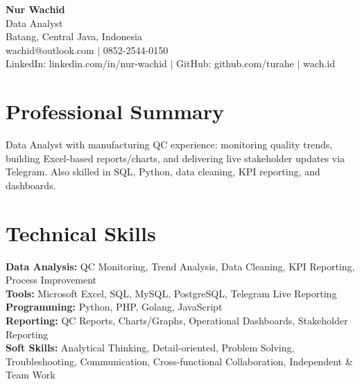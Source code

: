 \begin{center}
  {\LARGE\bfseries Nur Wachid}\\[3pt]
  Data Analyst\\[2pt]
  Batang, Central Java, Indonesia\\[2pt]
  wachid@outlook.com $|$ 0852-2544-0150\\[1pt]
  LinkedIn: linkedin.com/in/nur-wachid $|$ GitHub: github.com/turahe $|$ wach.id
\end{center}
\section*{Professional Summary}
Data Analyst with manufacturing QC experience: monitoring quality trends, building Excel-based reports/charts, and delivering live stakeholder updates via Telegram. Also skilled in SQL, Python, data cleaning, KPI reporting, and dashboards.
\section*{Technical Skills}
\textbf{Data Analysis:} QC Monitoring, Trend Analysis, Data Cleaning, KPI Reporting, Process Improvement\\[1pt]
\textbf{Tools:} Microsoft Excel, SQL, MySQL, PostgreSQL, Telegram Live Reporting\\[1pt]
\textbf{Programming:} Python, PHP, Golang, JavaScript\\[1pt]
\textbf{Reporting:} QC Reports, Charts/Graphs, Operational Dashboards, Stakeholder Reporting\\[1pt]
\textbf{Soft Skills:} Analytical Thinking, Detail-oriented, Problem Solving, Troubleshooting, Communication, Cross-functional Collaboration, Independent \& Team Work
